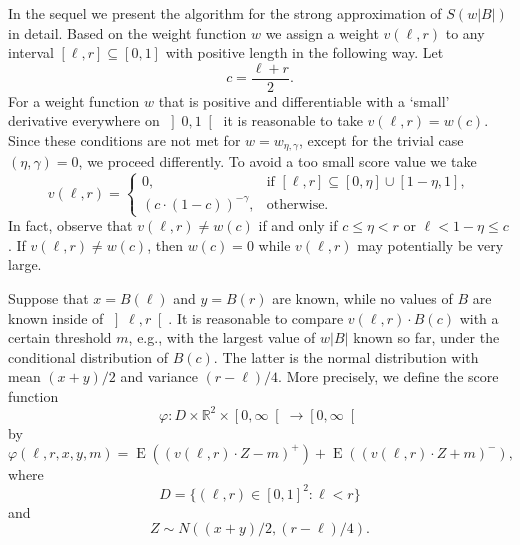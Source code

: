 \documentclass[a4paper]{amsart}
\theoremstyle{definition}
\theoremstyle{plain}
\newcommand{\R}{\mathbb R}
\newcommand{\E}{\operatorname{E}}
\begin{document}
In the sequel we present the algorithm for the strong approximation of
$S(w|B|)$ in detail. Based on the weight function $w$ we assign a weight
$v(\ell,r)$ to any interval $[\ell,r] \subseteq [0,1]$ with positive
length in the following way. Let
\[
c = \frac{\ell+r}{2}.
\]
For a weight function $w$ that is positive and differentiable
with a `small' derivative everywhere on $\left]0,1\right[$
it is reasonable to take $v(\ell,r) =w(c)$. Since these conditions are not
met for $w = w_{\eta,\gamma}$, except for the trivial case
$(\eta,\gamma)=0$, we proceed differently.
To avoid a too small score value we take
\[
v(\ell,r)
=\begin{cases}
0,  & \text{if $[\ell,r]\subseteq [0,\eta]\cup [1-\eta,1]$},\\
(c \cdot (1-c))^{-\gamma}, & \text{otherwise.}
\end{cases}
\]
In fact, observe that $v(\ell,r) \neq w(c)$ if and only if
$c \leq \eta < r$ or $\ell < 1-\eta \leq c$. If $v(\ell,r) \neq
w(c)$, then $w(c) = 0$ while $v(\ell,r)$ may
potentially be very large.

Suppose that $x = B(\ell)$ and $y = B(r)$ are known, while
no values of $B$ are known inside of $\left]\ell,r\right[$.
It is reasonable to compare $v(\ell,r) \cdot B(c)$ with a certain
threshold $m$, e.g., with the largest value of $w |B|$ known so far,
under the conditional distribution of $B(c)$. The latter is the normal
distribution with mean $(x+y)/2$ and variance $(r-\ell)/4$.
More precisely, we define the score function
\[
\varphi \colon D \times \R^2 \times \left[0,\infty\right[ \to
\left[0,\infty\right[
\]
by
\[
\varphi(\ell,r,x,y,m)
=
\E \left( (v(\ell,r)\cdot Z-m)^+\right)
+
\E \left( (v(\ell,r)\cdot Z+m)^-\right),
\]
where
\[
D = \{ (\ell,r) \in [0,1]^2 : \ell < r \}
\]
and
\[
Z \sim N((x+y)/2, (r-\ell)/4).
\]
\end{document}
